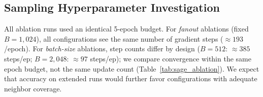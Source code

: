 \documentclass[10pt,twocolumn]{article}
\begin{document}
\subsection{Sampling Hyperparameter Investigation}
All ablation runs used an identical 5-epoch budget. For \emph{fanout} ablations
(fixed $B{=}1{,}024$), all configurations see the same number of gradient steps
($\approx193$/epoch). For \emph{batch-size} ablations, step counts differ by
design ($B{=}512$: $\approx385$ steps/ep; $B{=}2{,}048$: $\approx97$ steps/ep);
we compare convergence within the same epoch budget, not the same update count
(Table~\ref{tab:sage_ablation}). We expect that accuracy on extended runs would further
favor configurations with adequate neighbor coverage.

\begin{table}[htbp]
\centering
\caption{GraphSAGE Batch Size ($B$) and Fanout ($S$) ablation on
\texttt{ogbn-products}. All ablations: 5 epochs, seed 42.
\textbf{Bold}: best within 5-ep ablations. \textit{Italics}: 15-ep baseline.}
\label{tab:sage_ablation}
\end{table}
\end{document}
